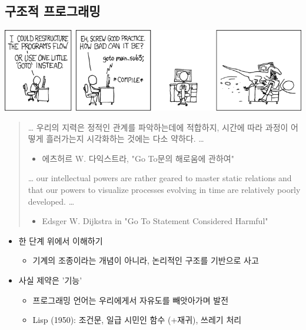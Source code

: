 \documentclass[a4paper,11pt]{article}
\begin{document}
\subsection{구조적 프로그래밍}
\label{sec:org295b28c}
\begin{center}
\includegraphics[width=.9\linewidth]{./goto.png}
\end{center}

\begin{quote}
\ldots{} 우리의 지력은 정적인 관계를 파악하는데에 적합하지, 시간에 따라 과정이 어떻게 흘러가는지 시각화하는 것에는 다소 약하다. \ldots{}
\begin{itemize}
\item 에츠허르 W. 다익스트라, "Go To문의 해로움에 관하여"
\end{itemize}
\ldots{} our intellectual powers are rather geared to master static relations and that our powers to visualize processes evolving in time are relatively poorly developed. \ldots{}
\begin{itemize}
\item Edsger W. Dijkstra in "Go To Statement Considered Harmful"
\end{itemize}
\end{quote}

\begin{itemize}
\item 한 단계 위에서 이해하기
\begin{itemize}
\item 기계의 조종이라는 개념이 아니라, 논리적인 구조를 기반으로 사고
\end{itemize}
\item 사실 제약은 '기능'
\begin{itemize}
\item 프로그래밍 언어는 우리에게서 자유도를 빼앗아가며 발전
\item Lisp (1950): 조건문, 일급 시민인 함수 (+재귀), 쓰레기 처리
\end{itemize}
\end{itemize}
\end{document}
